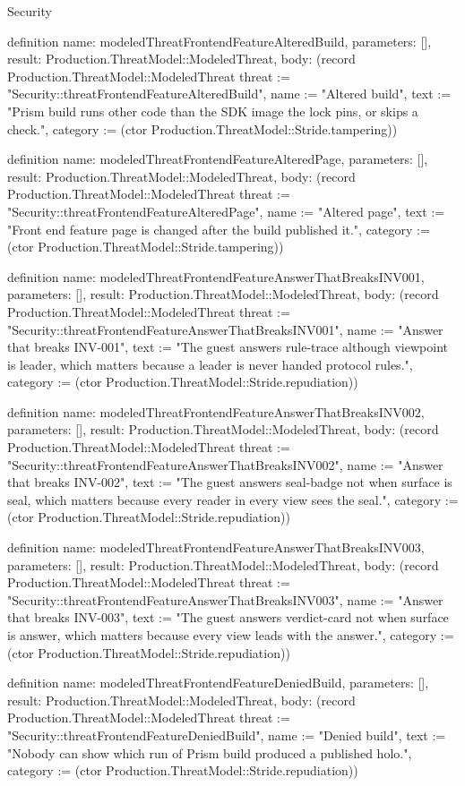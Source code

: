 \begin{lexlean}{Security}
\begin{semanticmodule}
definition{
  name: modeledThreatFrontendFeatureAlteredBuild,
  parameters: [],
  result: Production.ThreatModel::ModeledThreat,
  body: (record Production.ThreatModel::ModeledThreat {threat := "Security::threatFrontendFeatureAlteredBuild", name := "Altered build", text := "Prism build runs other code than the SDK image the lock pins, or skips a check.", category := (ctor Production.ThreatModel::Stride.tampering)})
}

definition{
  name: modeledThreatFrontendFeatureAlteredPage,
  parameters: [],
  result: Production.ThreatModel::ModeledThreat,
  body: (record Production.ThreatModel::ModeledThreat {threat := "Security::threatFrontendFeatureAlteredPage", name := "Altered page", text := "Front end feature page is changed after the build published it.", category := (ctor Production.ThreatModel::Stride.tampering)})
}

definition{
  name: modeledThreatFrontendFeatureAnswerThatBreaksINV001,
  parameters: [],
  result: Production.ThreatModel::ModeledThreat,
  body: (record Production.ThreatModel::ModeledThreat {threat := "Security::threatFrontendFeatureAnswerThatBreaksINV001", name := "Answer that breaks INV-001", text := "The guest answers rule-trace although viewpoint is leader, which matters because a leader is never handed protocol rules.", category := (ctor Production.ThreatModel::Stride.repudiation)})
}

definition{
  name: modeledThreatFrontendFeatureAnswerThatBreaksINV002,
  parameters: [],
  result: Production.ThreatModel::ModeledThreat,
  body: (record Production.ThreatModel::ModeledThreat {threat := "Security::threatFrontendFeatureAnswerThatBreaksINV002", name := "Answer that breaks INV-002", text := "The guest answers seal-badge not when surface is seal, which matters because every reader in every view sees the seal.", category := (ctor Production.ThreatModel::Stride.repudiation)})
}

definition{
  name: modeledThreatFrontendFeatureAnswerThatBreaksINV003,
  parameters: [],
  result: Production.ThreatModel::ModeledThreat,
  body: (record Production.ThreatModel::ModeledThreat {threat := "Security::threatFrontendFeatureAnswerThatBreaksINV003", name := "Answer that breaks INV-003", text := "The guest answers verdict-card not when surface is answer, which matters because every view leads with the answer.", category := (ctor Production.ThreatModel::Stride.repudiation)})
}

definition{
  name: modeledThreatFrontendFeatureDeniedBuild,
  parameters: [],
  result: Production.ThreatModel::ModeledThreat,
  body: (record Production.ThreatModel::ModeledThreat {threat := "Security::threatFrontendFeatureDeniedBuild", name := "Denied build", text := "Nobody can show which run of Prism build produced a published holo.", category := (ctor Production.ThreatModel::Stride.repudiation)})
}


\end{semanticmodule}
\end{lexlean}
